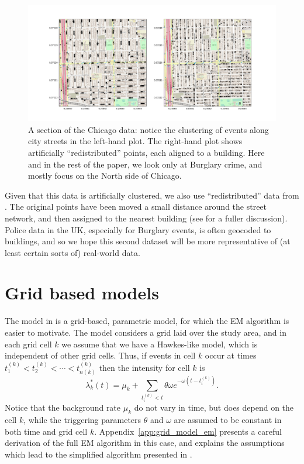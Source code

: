\documentclass[twoside,a4paper]{article}
\theoremstyle{plain}
\theoremstyle{definition}
\begin{document}
\begin{figure}
  \includegraphics[width=\textwidth]{../notebooks/Chicago_overview.png}
  \caption{A section of the Chicago data: notice the clustering of events along city
  streets in the left-hand plot.  The right-hand plot shows artificially ``redistributed''
  points, each aligned to a building.  Here and in the rest of the paper, we look only at
  Burglary crime, and mostly focus on the North side of Chicago.}
  \label{fig:chicago_overview}
\end{figure}

Given that this data is artificially clustered, we also use ``redistributed'' data from
\cite{daws1}. The original points have been moved a small distance around the street network,
and then assigned to the nearest building (see \cite{daws1} for a fuller discussion).
Police data in the UK, especially for Burglary events, is often geocoded to buildings, and so
we hope this second dataset will be more representative of (at least certain sorts of)
real-world data.



\section{Grid based models}\label{sec:gbm}

The model in \cite{sepp2} is a grid-based, parametric model, for which the EM
algorithm is easier to motivate.  The model considers a grid laid over the study area,
and in each grid cell $k$ we assume that we have a Hawkes-like model, which is independent
of other grid cells.  Thus, if events in cell $k$ occur at times $t^{(k)}_1 < 
t^{(k)}_2 < \cdots < t^{(k)}_{n(k)}$ then the intensity for cell $k$ is
\[ \lambda^*_k(t) = \mu_k + \sum_{t^{(k)}_i < t} \theta \omega
e^{-\omega(t-t^{(k)}_i)}. \]
Notice that the background rate $\mu_k$ do not vary in time, but does depend on the cell $k$,
while the triggering parameters $\theta$ and $\omega$ are assumed to be constant in both time
and grid cell $k$.  Appendix~\ref{app:grid_model_em} presents a careful derivation of
the full EM algorithm in this case, and explains the assumptions which lead to the simplified
algorithm presented in \cite[Section~2.2]{sepp2}.
\end{document}
